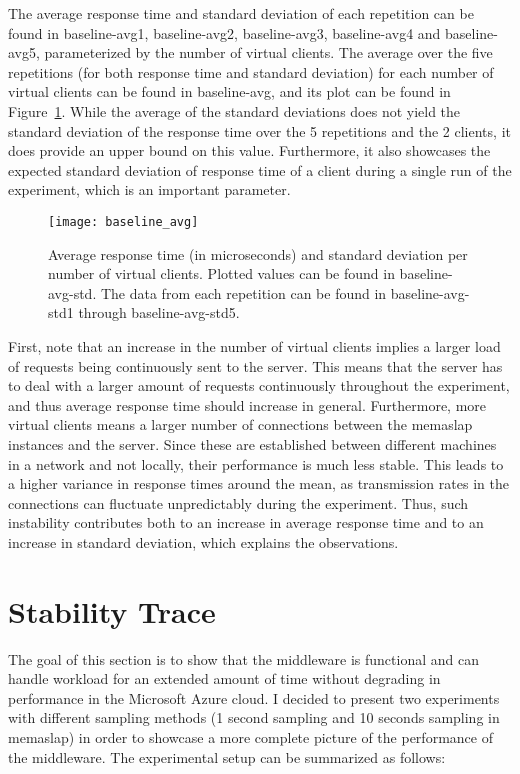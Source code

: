 \documentclass[11pt]{article}
\begin{document}
The average response time and standard deviation of each repetition can be found in baseline-avg1, baseline-avg2, baseline-avg3, baseline-avg4 and baseline-avg5, parameterized by the number of virtual clients. The average over the five repetitions (for both response time and standard deviation) for each number of virtual clients can be found in baseline-avg, and its plot can be found in Figure~\ref{baseline:avg}. While the average of the standard deviations does not yield the standard deviation of the response time over the 5 repetitions and the 2 clients, it does provide an upper bound on this value. Furthermore, it also showcases the expected standard deviation of response time of a client during a single run of the experiment, which is an important parameter.

\begin{figure}[H]
	\centering
	\texttt{[image: baseline\_avg]}
	\caption{Average response time (in microseconds) and standard deviation per number of virtual clients. Plotted values can be found in baseline-avg-std. The data from each repetition can be found in baseline-avg-std1 through baseline-avg-std5.}
	\label{baseline:avg}
\end{figure}

First, note that an increase in the number of virtual clients implies a larger load of requests being continuously sent to the server. This means that the server has to deal with a larger amount of requests continuously throughout the experiment, and thus average response time should increase in general. Furthermore, more virtual clients means a larger number of connections between the memaslap instances and the server. Since these are established between different machines in a network and not locally, their performance is much less stable. This leads to a higher variance in response times around the mean, as transmission rates in the connections can fluctuate unpredictably during the experiment. Thus, such instability contributes both to an increase in average response time and to an increase in standard deviation, which explains the observations.

\section{Stability Trace}\label{sec:trace}

The goal of this section is to show that the middleware is functional and can handle workload for an extended amount of time without degrading in performance in the Microsoft Azure cloud. I decided to present two experiments with different sampling methods (1 second sampling and 10 seconds sampling in memaslap) in order to showcase a more complete picture of the performance of the middleware. The experimental setup can be summarized as follows: 
\end{document}
